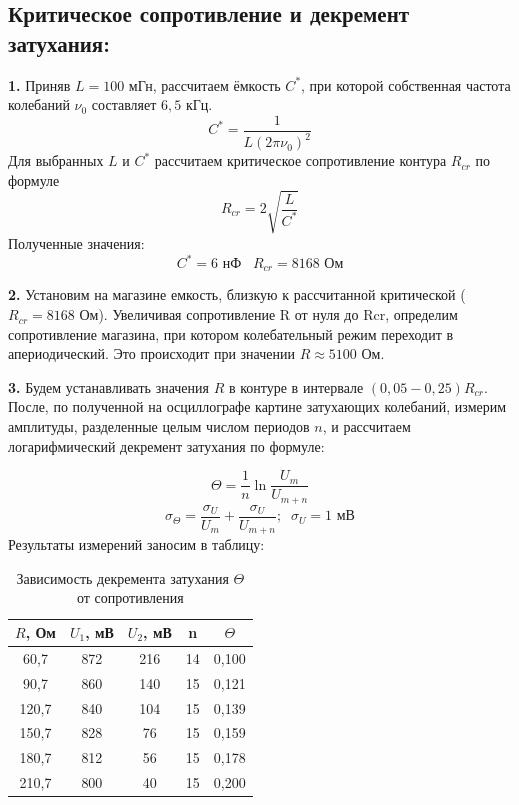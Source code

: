 \documentclass[a4paper, 12pt]{article}
\begin{document}
\newpage
\subsection{Критическое сопротивление и декремент затухания:}

\textbf{1.} Приняв $L = 100$ мГн, рассчитаем ёмкость $C^*$, при которой собственная частота колебаний $\nu_0$ составляет $6,5$ кГц.
$$C^* = \frac{1}{L(2\pi \nu_0)^2}$$
Для выбранных $L$ и $C^*$ рассчитаем критическое сопротивление контура $R_{cr}$ по формуле
$$R_{cr} = 2\sqrt{\frac{L}{C^*}}$$
Полученные значения:
$$C^* = 6 \text{ нФ} \;\;\; R_{cr} = 8168 \text{ Ом}$$

\textbf{2.} Установим на магазине емкость, близкую к рассчитанной критической ($R_{cr} = 8168$ Ом). Увеличивая сопротивление R от нуля до Rcr, определим сопротивление магазина, при котором колебательный режим переходит в апериодический. Это происходит при значении $R \approx 5100$ Ом.

\textbf{3.} Будем устанавливать значения $R$ в контуре в интервале $(0,05-0,25)R_{cr}$. После, по полученной на осциллографе картине затухающих колебаний, измерим амплитуды, разделенные целым числом периодов $n$, и рассчитаем логарифмический декремент затухания по формуле:

$$\Theta = \frac{1}{n}\ln{\frac{U_m}{U_{m+n}}}$$
$$\sigma_\Theta = \frac{\sigma_U}{U_m} +  \frac{\sigma_U}{U_{m+n}}; \;\; \sigma_U = 1 \text{ мВ}$$
Результаты измерений заносим в таблицу:

\begin{table}[h]
\centering
\caption{Зависимость декремента затухания $\Theta$ от сопротивления}
\vspace{0.3cm}
\label{tab:2}
\begin{tabular}{|c|c|c|c|c|}
\hline
$R$, Ом & $U_1$, мВ & $U_2$, мВ & n  & $\Theta$ \\ \hline
60,7      & 872       & 216       & 14 & 0,100    \\ \hline
90,7      & 860       & 140       & 15 & 0,121    \\ \hline
120,7     & 840       & 104       & 15 & 0,139    \\ \hline
150,7     & 828       & 76        & 15 & 0,159    \\ \hline
180,7     & 812       & 56        & 15 & 0,178    \\ \hline
210,7     & 800       & 40        & 15 & 0,200    \\ \hline
\end{tabular}
\end{table}
\end{document}
